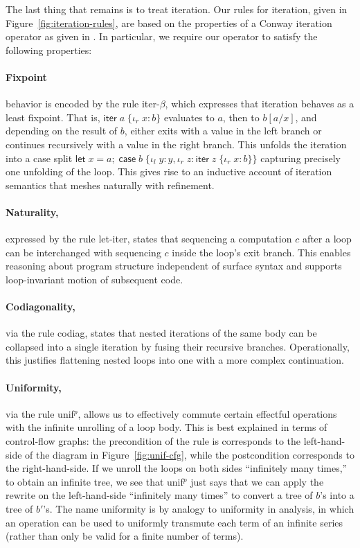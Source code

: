 \documentclass[acmsmall,screen,anonymous,review]{acmart}
\newcommand{\ms}[1]{\ensuremath{\mathsf{#1}}}
\newcommand{\lto}{:}
\newcommand{\linl}[1]{\iota_l\;{#1}}
\newcommand{\linr}[1]{\iota_r\;{#1}}
\newcommand{\letexpr}[3]{\ensuremath{\ms{let}\;#1 = #2;\;#3}}
\newcommand{\caseexpr}[5]{\ms{case}\;#1\;\{\linl{#2} \lto #3, \linr{#4} \lto #5\}}
\newcommand{\liter}[3]{\ms{iter}\;#1\;\{ \linr{#2} \lto #3 \}}
\begin{document}
The last thing that remains is to treat iteration. Our rules for iteration, given in
Figure~\ref{fig:iteration-rules}, are based on the properties of a Conway iteration operator as
given in \citet{coinductive-resumption-levy-goncharov-19}. In particular, we require our operator to
satisfy the following properties:
%
\paragraph{Fixpoint} behavior is encoded by the rule \textsf{iter-$\beta$}, which expresses that
iteration behaves as a least fixpoint. That is, $\liter{a}{x}{b}$ evaluates to $a$, then to
$b[a/x]$, and depending on the result of $b$, either exits with a value in the left branch or
continues recursively with a value in the right branch. This unfolds the iteration into a case
split
$
\letexpr{x}{a}{\caseexpr{b}{y}{y}{z}{\liter{z}{x}{b}}}
$
capturing precisely one unfolding of the loop. This gives rise to an inductive account of iteration
semantics that meshes naturally with refinement.
%
\paragraph{Naturality,} expressed by the rule \textsf{let-iter}, states that sequencing a
computation $c$ after a loop can be interchanged with sequencing $c$ inside the loop’s exit branch.
This enables reasoning about program structure independent of surface syntax and supports
loop-invariant motion of subsequent code.
%
\paragraph{Codiagonality,} via the rule \textsf{codiag}, states that nested iterations of the same
body can be collapsed into a single iteration by fusing their recursive branches. Operationally,
this justifies flattening nested loops into one with a more complex continuation.
%
\paragraph{Uniformity,} via the rule \textsf{unif$^p$}, allows us to effectively commute certain
effectful operations with the infinite unrolling of a loop body. This is best explained in terms of
control-flow graphs: the precondition of the rule is corresponds to the left-hand-side of the
diagram in Figure~\ref{fig:unif-cfg}, while the postcondition corresponds to the right-hand-side. If
we unroll the loops on both sides ``infinitely many times,'' to obtain an infinite tree, we see that
\textsf{unif$^p$} just says that we can apply the rewrite on the left-hand-side ``infinitely many
times'' to convert a tree of $b$'s into a tree of $b'$'s. The name uniformity is by analogy to
uniformity in analysis, in which an operation can be used to uniformly transmute each term of an
infinite series (rather than only be valid for a finite number of terms).
\end{document}
